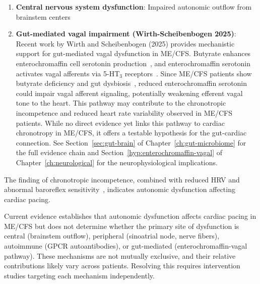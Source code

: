 \begin{enumerate}
    Levels of vasoregulative GPCR autoantibodies correlate with symptom severity, autonomic dysfunction, and disability in ME/CFS~\cite{Sotzny2021}. The correlation with autonomic measures supports a direct pathophysiological role rather than an epiphenomenon of chronic illness. Beta-2 adrenergic receptor autoantibodies appear particularly relevant to cardiovascular symptoms, with immunoadsorption targeting these antibodies showing preliminary efficacy in post-COVID ME/CFS~\cite{Stein2024immunoadsorption}. BC007, a DNA aptamer that neutralizes GPCR autoantibodies, has shown promise in case reports for improving fatigue and microcirculatory function~\cite{Hohberger2021bc007}. Three complementary approaches to the autoantibody hypothesis---immunoadsorption, BC007, and daratumumab---are in active clinical trials (Appendix~\ref{app:research-registry}, Section~\ref{sec:registry-autoimmunity}).
    \item \textbf{Central nervous system dysfunction}: Impaired autonomic outflow from brainstem centers
    \item \textbf{Gut-mediated vagal impairment (Wirth-Scheibenbogen 2025)}: Recent work by Wirth and Scheibenbogen (2025) provides mechanistic support for gut-mediated vagal dysfunction in ME/CFS. Butyrate enhances enterochromaffin cell serotonin production~\cite{Barton2025}, and enterochromaffin serotonin activates vagal afferents via 5-HT$_3$ receptors~\cite{Barton2023,Kaelberer2018}. Since ME/CFS patients show butyrate deficiency and gut dysbiosis~\cite{Hsu2025gut}, reduced enterochromaffin serotonin could impair vagal afferent signaling, potentially weakening efferent vagal tone to the heart. This pathway may contribute to the chronotropic incompetence and reduced heart rate variability observed in ME/CFS patients. While no direct evidence yet links this pathway to cardiac chronotropy in ME/CFS, it offers a testable hypothesis for the gut-cardiac connection. See Section~\ref{sec:gut-brain} of Chapter~\ref{ch:gut-microbiome} for the full evidence chain and Section~\ref{hyp:enterochromaffin-vagal} of Chapter~\ref{ch:neurological} for the neurophysiological implications.
\end{enumerate}

The finding of chronotropic incompetence, combined with reduced HRV and abnormal baroreflex sensitivity~\cite{Newton2007autonomicDysfunction}, indicates autonomic dysfunction affecting cardiac pacing.

\begin{limitation}
Current evidence establishes that autonomic dysfunction affects cardiac pacing in ME/CFS but does not determine whether the primary site of dysfunction is central (brainstem outflow), peripheral (sinoatrial node, nerve fibers), autoimmune (GPCR autoantibodies), or gut-mediated (enterochromaffin-vagal pathway). These mechanisms are not mutually exclusive, and their relative contributions likely vary across patients. Resolving this requires intervention studies targeting each mechanism independently.
\end{limitation}

